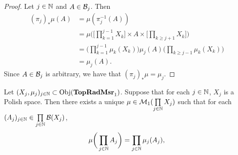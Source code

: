 \documentclass{book}
\begin{document}
	\begin{proof}
		Let $j \in \mathbb{N}$ and $A \in \mathcal{B}_j$. Then 
		\begin{align*}
			(\pi_j)_*\mu(A)
			& = \mu(\pi_j^{-1}(A)) \\
			& = \mu \bigg( \bigg[ \prod_{k=1}^{j-1} X_k \bigg] \times A \times \bigg[ \prod_{k \geq j+1} X_k \bigg] \bigg) \\
			& = \bigg( \prod_{k=1}^{j-1} \mu_k(X_k)  \bigg) \mu_j(A) \bigg( \prod_{k \geq j-1} \mu_k(X_k) \bigg) \\
			& = \mu_j(A). 
		\end{align*}
		Since $A \in \mathcal{B}_j$ is arbitrary, we have that $(\pi_j)_*\mu = \mu_j$.
	\end{proof}
	
	\begin{ex} 
		Let $(X_j, \mu_j)_{j \in \mathbb{N}} \subset \operatorname{Obj}(\operatorname{\text{\textbf{TopRadMsr}}_1})$. Suppose that for each $j \in \mathbb{N}$, $X_j$ is a Polish space.
		Then there exists a unique $\mu \in \mathcal{M}_1(\prod\limits_{j \in \mathbb{N}} X_j)$ such that for each $(A_j)_{j \in \mathbb{N}} \in \prod\limits_{j \in \mathbb{N}} \mathcal{B}(X_j)$, 
		$$\mu \bigg(\prod_{j \in \mathbb{N}} A_j \bigg) = \prod_{j \in \mathbb{N}} \mu_j(A_j),$$
	\end{ex}
	
\end{document}
